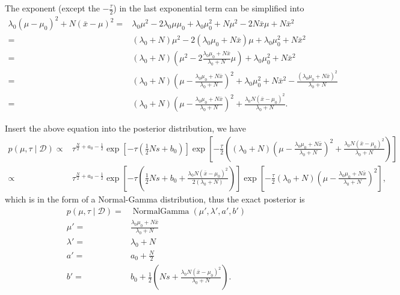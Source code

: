 \documentclass[11pt]{extarticle}
\newcommand{\D}{\mathcal{D}}
\newcommand{\0}{\mathbf{0}}
\renewcommand{\(}{\left(}
\renewcommand{\)}{\right)}
\DeclareMathOperator{\NormalGamma}{NormalGamma}
\theoremstyle{definition}
\begin{document}
\par The exponent (except the $-\frac{\tau}{2}$) in the last exponential term can be simplified into
\begin{align*}
	\lambda_{0}(\mu - \mu_{0})^{2} + N(\bar{x} - \mu)^{2} =& \lambda_{0} \mu^{2} - 2\lambda_{0}\mu\mu_{0} + \lambda_{0}\mu_{0}^{2} + N\mu^{2} - 2N\bar{x}\mu + N\bar{x}^{2} \\
	=& (\lambda_{0} + N)\mu^{2} - 2(\lambda_{0}\mu_{0} + N\bar{x})\mu + \lambda_{0}\mu_{0}^{2} + N\bar{x}^{2} \\
	=& (\lambda_{0} + N)\left( \mu^{2} - 2\frac{\lambda_{0}\mu_{0} + N\bar{x}}{\lambda_{0} + N}\mu \right) + \lambda_{0}\mu_{0}^{2} + N\bar{x}^{2} \\
	=& (\lambda_{0} + N)\left( \mu - \frac{\lambda_{0}\mu_{0} + N \bar{x}}{\lambda_{0} + N} \right)^{2} + \lambda_{0}\mu_{0}^{2} + N\bar{x}^{2} - \frac{(\lambda_{0}\mu_{0} + N\bar{x})^{2}}{\lambda_{0} + N} \\
	=& (\lambda_{0} + N)\left( \mu - \frac{\lambda_{0}\mu_{0} + N\bar{x}}{\lambda_{0} + N} \right)^{2} + \frac{\lambda_{0}N(\bar{x} - \mu_{0})^{2}}{\lambda_{0} + N}.
\end{align*}
\par Insert the above equation into the posterior distribution, we have
\begin{align*}
	p(\mu, \tau \mid \D) \propto& \tau^{\frac{N}{2} + a_{0} - \frac{1}{2}} \exp\left[-\tau\left(\frac{1}{2}Ns + b_{0}\right)\right] \exp\left[-\frac{\tau}{2}\left( (\lambda_{0} + N)\left( \mu - \frac{\lambda_{0}\mu_{0} + N\bar{x}}{\lambda_{0} + N} \right)^{2} + \frac{\lambda_{0}N(\bar{x} - \mu_{0})^{2}}{\lambda_{0} + N} \right)\right] \\
	\propto& \tau^{\frac{N}{2} + a_{0} - \frac{1}{2}} \exp\left[-\tau\left(\frac{1}{2}Ns + b_{0} + \frac{\lambda_{0}N(\bar{x} - \mu_{0})^{2}}{2(\lambda_{0} + N)}\right)\right] \exp\left[-\frac{\tau}{2} (\lambda_{0} + N)\left( \mu - \frac{\lambda_{0}\mu_{0} + N\bar{x}}{\lambda_{0} + N} \right)^{2} \right],
\end{align*}
which is in the form of a Normal-Gamma distribution, thus the exact posterior is
\begin{align*}
	p(\mu, \tau \mid \D) =& \NormalGamma(\mu', \lambda', a', b') \\
	\mu' =& \frac{\lambda_{0}\mu_{0} + N\bar{x}}{\lambda_{0} + N} \\
	\lambda' =& \lambda_{0} + N \\
	a' =& a_{0} + \frac{N}{2} \\
	b' =& b_{0} + \frac{1}{2}\left(Ns + \frac{\lambda_{0}N(\bar{x} - \mu_{0})^{2}}{\lambda_{0} + N}\right).
\end{align*}
\end{document}
